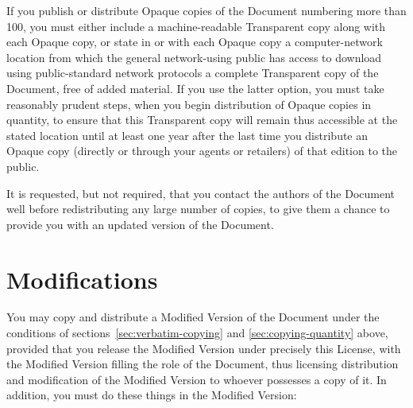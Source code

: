 If you publish or distribute Opaque copies of the Document numbering
more than 100, you must either include a machine-readable Transparent
copy along with each Opaque copy, or state in or with each Opaque copy
a computer-network location from which the general network-using
public has access to download using public-standard network protocols
a complete Transparent copy of the Document, free of added material.
If you use the latter option, you must take reasonably prudent steps,
when you begin distribution of Opaque copies in quantity, to ensure
that this Transparent copy will remain thus accessible at the stated
location until at least one year after the last time you distribute an
Opaque copy (directly or through your agents or retailers) of that
edition to the public.

It is requested, but not required, that you contact the authors of the
Document well before redistributing any large number of copies, to
give them a chance to provide you with an updated version of the
Document.


\section{Modifications}
\label{sec:modifications}

You may copy and distribute a Modified Version of the Document under
the conditions of sections~\ref{sec:verbatim-copying} and
\ref{sec:copying-quantity} above, provided that you release the
Modified Version under precisely this License, with the Modified
Version filling the role of the Document, thus licensing distribution
and modification of the Modified Version to whoever possesses a copy
of it.  In addition, you must do these things in the Modified Version:

